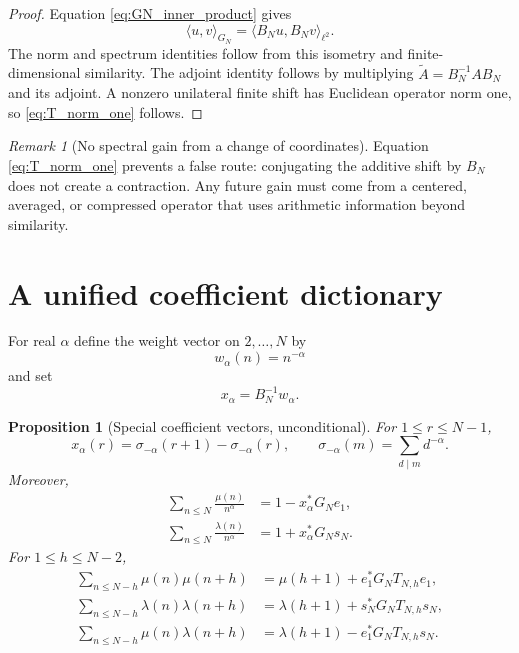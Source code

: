 \documentclass[11pt]{amsart}
\numberwithin{equation}{section}
\theoremstyle{plain}
\newtheorem{proposition}[theorem]{Proposition}
\theoremstyle{definition}
\theoremstyle{remark}
\newtheorem{remark}[theorem]{Remark}
\newcommand{\mob}{\mu}
\newcommand{\liou}{\lambda}
\begin{document}
\begin{proof}
Equation \eqref{eq:GN_inner_product} gives
\begin{equation}
\langle u,v\rangle_{G_N}=\langle B_Nu,B_Nv\rangle_{\ell^2}.
\label{eq:isometry_identity}
\end{equation}
The norm and spectrum identities follow from this isometry and finite-dimensional similarity.  The adjoint identity follows by multiplying $\widetilde A=B_N^{-1}AB_N$ and its adjoint.  A nonzero unilateral finite shift has Euclidean operator norm one, so \eqref{eq:T_norm_one} follows.
\end{proof}

\begin{remark}[No spectral gain from a change of coordinates]
\label{rem:no_spectral_gain}
Equation \eqref{eq:T_norm_one} prevents a false route: conjugating the additive shift by $B_N$ does not create a contraction.  Any future gain must come from a centered, averaged, or compressed operator that uses arithmetic information beyond similarity.
\end{remark}

\section{A unified coefficient dictionary}
\label{sec:dictionary}

For real $\alpha$ define the weight vector on $2,\ldots,N$ by
\begin{equation}
w_\alpha(n)=n^{-\alpha}
\label{eq:w_alpha}
\end{equation}
and set
\begin{equation}
x_\alpha=B_N^{-1}w_\alpha.
\label{eq:x_alpha_definition}
\end{equation}

\begin{proposition}[Special coefficient vectors, unconditional]
\label{prop:coefficient_dictionary}
For $1\le r\le N-1$,
\begin{equation}
x_\alpha(r)=\sigma_{-\alpha}(r+1)-\sigma_{-\alpha}(r),
\qquad
\sigma_{-\alpha}(m)=\sum_{d\mid m}d^{-\alpha}.
\label{eq:x_alpha_formula}
\end{equation}
Moreover,
\begin{align}
\sum_{n\le N}\frac{\mob(n)}{n^\alpha}
&=1-x_\alpha^*G_Ne_1,
\label{eq:mu_weighted_dictionary}\\
\sum_{n\le N}\frac{\liou(n)}{n^\alpha}
&=1+x_\alpha^*G_Ns_N.
\label{eq:lambda_weighted_dictionary}
\end{align}
For $1\le h\le N-2$,
\begin{align}
\sum_{n\le N-h}\mob(n)\mob(n+h)
&=\mob(h+1)+e_1^*G_NT_{N,h}e_1,
\label{eq:mu_correlation_dictionary}\\
\sum_{n\le N-h}\liou(n)\liou(n+h)
&=\liou(h+1)+s_N^*G_NT_{N,h}s_N,
\label{eq:lambda_correlation_dictionary}\\
\sum_{n\le N-h}\mob(n)\liou(n+h)
&=\liou(h+1)-e_1^*G_NT_{N,h}s_N.
\label{eq:mixed_correlation_dictionary}
\end{align}
\end{proposition}
\end{document}
